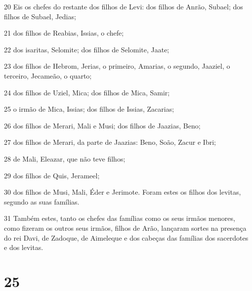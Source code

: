 \par 20 Eis os chefes do restante dos filhos de Levi: dos filhos de Anrão, Subael; dos filhos de Subael, Jedias;
\par 21 dos filhos de Reabias, Issias, o chefe;
\par 22 dos isaritas, Selomite; dos filhos de Selomite, Jaate;
\par 23 dos filhos de Hebrom, Jerias, o primeiro, Amarias, o segundo, Jaaziel, o terceiro, Jecameão, o quarto;
\par 24 dos filhos de Uziel, Mica; dos filhos de Mica, Samir;
\par 25 o irmão de Mica, Issias; dos filhos de Issias, Zacarias;
\par 26 dos filhos de Merari, Mali e Musi; dos filhos de Jaazias, Beno;
\par 27 dos filhos de Merari, da parte de Jaazias: Beno, Soão, Zacur e Ibri;
\par 28 de Mali, Eleazar, que não teve filhos;
\par 29 dos filhos de Quis, Jerameel;
\par 30 dos filhos de Musi, Mali, Éder e Jerimote. Foram estes os filhos dos levitas, segundo as suas famílias.
\par 31 Também estes, tanto os chefes das famílias como os seus irmãos menores, como fizeram os outros seus irmãos, filhos de Arão, lançaram sortes na presença do rei Davi, de Zadoque, de Aimeleque e dos cabeças das famílias dos sacerdotes e dos levitas.

\chapter{25}

